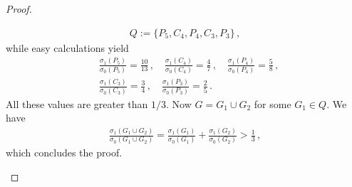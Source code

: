 \documentclass[a4paper,12pt]{amsart}
\newtheorem{lemma}{Lemma}
\theoremstyle{remark}
\begin{document}
\begin{proof}
\begin{itemize}
\begin{align*}
Q:=\{P_5,C_4,P_4,C_3,P_3\}\,,
\end{align*}
while easy calculations yield
\begin{align*}
&\frac{\sigma_1(P_5)}{\sigma_0(P_5)}=\frac{10}{13}\,, \quad \frac{\sigma_1(C_4)}{\sigma_0(C_4)}=\frac{4}{7}\,, \quad \frac{\sigma_1(P_4)}{\sigma_0(P_4)}=\frac{5}{8}\,, \\
&\frac{\sigma_1(C_3)}{\sigma_0(C_3)}=\frac{3}{4}\,, \quad \frac{\sigma_1(P_3)}{\sigma_0(P_3)}=\frac{2}{5}\,.
\end{align*}
All these values are greater than $1/3$. Now $G=G_1 \cup G_2$ for some $G_1\in Q$. We have
\begin{align*}
\frac{ \sigma_1(G_1 \cup G_2)}{ \sigma_0(G_1 \cup G_2)}=\frac{ \sigma_1(G_1)}{ \sigma_0(G_1)}+\frac{ \sigma_1(G_2)}{\sigma_0(G_2)} > \frac{1}{3}\,,
\end{align*}
which concludes the proof.
\end{itemize}

\end{proof}











 

\end{document}
